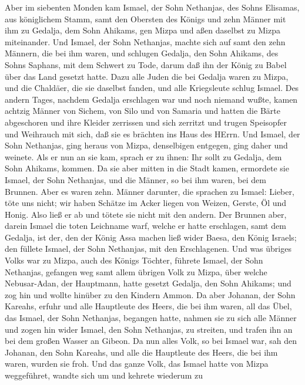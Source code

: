  Aber im siebenten Monden kam Ismael, der Sohn Nethanjas,
des Sohns Elisamas, aus königlichem Stamm, samt den Obersten des Königs
und zehn Männer mit ihm zu Gedalja, dem Sohn Ahikams, gen Mizpa und aßen
daselbst zu Mizpa miteinander.  Und Ismael, der Sohn
Nethanjas, machte sich auf samt den zehn Männern, die bei ihm waren, und
schlugen Gedalja, den Sohn Ahikams, des Sohns Saphans, mit dem Schwert
zu Tode, darum daß ihn der König zu Babel über das Land gesetzt hatte.
 Dazu alle Juden die bei Gedalja waren zu Mizpa, und die
Chaldäer, die sie daselbst fanden, und alle Kriegsleute schlug Ismael.
 Des andern Tages, nachdem Gedalja erschlagen war und noch
niemand wußte,  kamen achtzig Männer von Sichem, von Silo
und von Samaria und hatten die Bärte abgeschoren und ihre Kleider
zerrissen und sich zerritzt und trugen Speisopfer und Weihrauch mit
sich, daß sie es brächten ins Haus des HErrn.  Und Ismael,
der Sohn Nethanjas, ging heraus von Mizpa, denselbigen entgegen, ging
daher und weinete. Als er nun an sie kam, sprach er zu ihnen: Ihr sollt
zu Gedalja, dem Sohn Ahikams, kommen.  Da sie aber mitten in
die Stadt kamen, ermordete sie Ismael, der Sohn Nethanjas, und die
Männer, so bei ihm waren, bei dem Brunnen.  Aber es waren
zehn. Männer darunter, die sprachen zu Ismael: Lieber, töte uns nicht;
wir haben Schätze im Acker liegen von Weizen, Gerste, Öl und Honig. Also
ließ er ab und tötete sie nicht mit den andern.  Der Brunnen
aber, darein Ismael die toten Leichname warf, welche er hatte
erschlagen, samt dem Gedalja, ist der, den der König Assa machen ließ
wider Baesa, den König Israels; den füllete Ismael, der Sohn Nethanjas,
mit den Erschlagenen.  Und was übriges Volks war zu Mizpa,
auch des Königs Töchter, führete Ismael, der Sohn Nethanjas, gefangen
weg samt allem übrigen Volk zu Mizpa, über welche Nebusar-Adan, der
Hauptmann, hatte gesetzt Gedalja, den Sohn Ahikams; und zog hin und
wollte hinüber zu den Kindern Ammon.  Da aber Johanan, der
Sohn Kareahs, erfuhr und alle Hauptleute des Heers, die bei ihm waren,
all das Übel, das Ismael, der Sohn Nethanjas, begangen hatte,
 nahmen sie zu sich alle Männer und zogen hin wider Ismael,
den Sohn Nethanjas, zu streiten, und trafen ihn an bei dem großen Wasser
an Gibeon.  Da nun alles Volk, so bei Ismael war, sah den
Johanan, den Sohn Kareahs, und alle die Hauptleute des Heers, die bei
ihm waren, wurden sie froh.  Und das ganze Volk, das Ismael
hatte von Mizpa weggeführet, wandte sich um und kehrete wiederum zu
